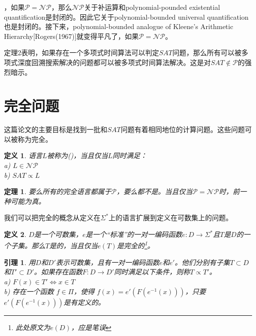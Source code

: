 \documentclass[twocolumn]{article}
\newtheorem{definition}{\hspace{2em}定义}
\newtheorem{lemma}{\hspace{2em}引理}
\newtheorem{theorem}{\hspace{2em}定理}
\theoremstyle{nonumberplain}%
\begin{document}
\begin{CJK}{UTF8}{gbsn}
    {}，如果$\mathcal{P}=\mathcal{NP}$，那么$\mathcal{NP}$关于补运算和polynomial-pounded existential quantification是封闭的。因此它关于polynomial-bounded universal quantification也是封闭的。接下来，polynomial-bounded analogue of Kleene's Arithmetic Hierarchy[Rogers(1967)]就变得平凡了，如果$\mathcal{P}=\mathcal{NP}$。

    定理2表明，如果存在一个多项式时间算法可以判定$SAT$问题，那么所有可以被多项式深度回溯搜索解决的问题都可以被多项式时间算法解决。这是对$SAT\not\in\mathcal{P}$的强烈暗示。

\section{完全问题}
    这篇论文的主要目标是找到一批和$SAT$问题有着相同地位的计算问题。这些问题可以被称为完全。
    \begin{definition}
        语言$L$被称为({}){}，当且仅当$L$同时满足：\\
        \indent a) $L\in\mathcal{NP}$\\
        \indent b) $SAT\propto L$\\
    \end{definition}

    \begin{theorem}
        要么所有的完全语言都属于$\mathcal{P}$，要么都不是。当且仅当$\mathcal{P}=\mathcal{NP}$时，前一种可能为真。
    \end{theorem}

    我们可以把完全的概念从定义在$\Sigma^*$上的语言扩展到定义在可数集上的问题。
    
    \begin{definition}
        $D$是一个可数集，$e$是一个“标准”的一对一编码函数$e:D\rightarrow\Sigma^*$且$T$是$D$的一个子集。那么$T$是{}的，当且仅当$e(T)$是完全的\footnote{此处原文为$e(D)$，应是笔误}。
    \end{definition}

    \begin{lemma}
        用$D$和$D'$表示可数集，且有一对一编码函数$e$和$e'$。他们分别有子集$T\subset D$和$T'\subset D'$。如果存在函数$F:D\rightarrow D'$同时满足以下条件，则称$T\propto T'$。\\
        \indent a) $F(x)\in T' \Leftrightarrow x\in T$\\
        \indent b) 存在一个函数 $f\in\Pi$，使得 $f(x)=e'(F(e^{-1}(x)))$，只要$e'(F(e^{-1}(x)))$是有定义的。\\
    \end{lemma}


\end{CJK}
\end{document}
